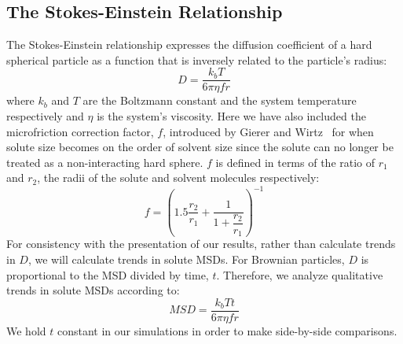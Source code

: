 \documentclass[journal=jpcbfk,manuscript=article]{achemso}
\begin{document}
  \subsection{The Stokes-Einstein Relationship}\label{method:stokes}
  
  The Stokes-Einstein relationship expresses the diffusion coefficient of 
  a hard spherical particle as a function that is inversely related to the
  particle's radius:
  \begin{equation}
  D = \dfrac{k_bT}{6\pi\eta fr}
  \label{eqn:stokes-einstein}
  \end{equation}
  where $k_b$ and $T$ are the Boltzmann	constant and the system temperature
  respectively and $\eta$ is the system's viscosity. Here we have also 
  included the microfriction correction factor, $f$, introduced by 
  Gierer and Wirtz~\cite{gierer_molekulare_1953,chen_diffusion_1984} for when
  solute size becomes on the order of solvent size since the solute can no 
  longer be treated as a non-interacting hard sphere. $f$ is defined in terms
  of the ratio of $r_1$ and $r_2$, the radii of the solute and solvent molecules
  respectively:
  \begin{equation}
  f = \left(1.5\dfrac{r_2}{r_1} + \dfrac{1}{1 + \dfrac{r_2}{r_1}}\right)^{-1}
  \label{eqn:correction_factor}
  \end{equation}
  For consistency with the presentation of our results, rather than calculate 
  trends in $D$, we will calculate trends in solute MSDs. For Brownian
  particles, $D$ is proportional to the MSD divided by time, $t$. Therefore, 
  we analyze qualitative trends in solute MSDs according to:
  \begin{equation}
  MSD = \dfrac{k_bTt}{6\pi\eta fr}
  \label{eqn:msd-stokes-einstein}
  \end{equation}
  We hold $t$ constant in our simulations in order to make side-by-side comparisons. 

  
\end{document}
